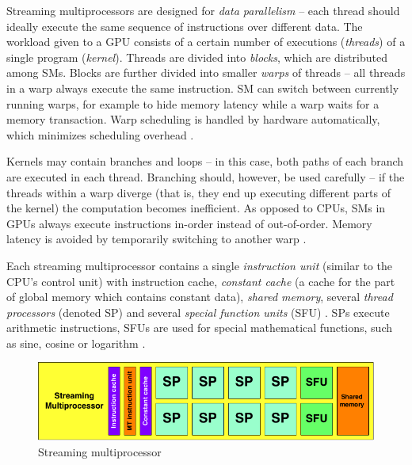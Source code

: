 \documentclass[12pt,oneside]{fithesis2}
\begin{document}
      
      Streaming multiprocessors are designed for \emph{data parallelism} -- each thread should ideally execute the same sequence of instructions over different data. The workload given to a GPU consists of a certain number of executions (\emph{threads}) of a single program (\emph{kernel}). Threads are divided into \emph{blocks}, which are distributed among SMs. Blocks are further divided into smaller \emph{warps} of threads -- all threads in a warp always execute the same instruction. SM can switch between currently running warps, for example to hide memory latency while a warp waits for a memory transaction. Warp scheduling is handled by hardware automatically, which minimizes scheduling overhead \cite{nvidia:gpuArch}.
      
      Kernels may contain branches and loops -- in this case, both paths of each branch are executed in each thread. Branching should, however, be used carefully -- if the threads within a warp diverge (that is, they end up executing different parts of the kernel) the computation becomes inefficient. As opposed to CPUs, SMs in GPUs always execute instructions in-order instead of out-of-order. Memory latency is avoided by temporarily switching to another warp \cite{nvidia:gpuArch}.
            
      Each streaming multiprocessor contains a single \emph{instruction unit} (similar to the CPU's control unit) with instruction cache, \emph{constant cache} (a cache for the part of global memory which contains constant data), \emph{shared memory}, several \emph{thread processors} (denoted SP) and several \emph{special function units} (SFU) \cite{nvidia:gpuArch}. SPs execute arithmetic instructions, SFUs are used for special mathematical functions, such as sine, cosine or logarithm \cite{nvidia:gpuArch}.
      
      \begin{figure}
        \centering
        \includegraphics[width=\linewidth]{images/sm.png}
        \caption{Streaming multiprocessor\protect\footnotemark}
      \end{figure}
      
\end{document}
